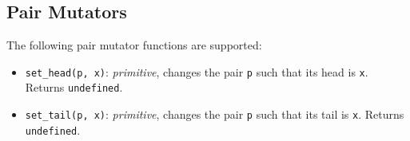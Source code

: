 \subsection*{Pair Mutators}

The following pair mutator functions are supported:

\begin{itemize}
\item \lstinline{set_head(p, x)}: \textit{primitive}, changes the pair \lstinline{p} such that its head is \lstinline{x}.
Returns \lstinline{undefined}.
\item \lstinline{set_tail(p, x)}: \textit{primitive}, changes the pair \lstinline{p} such that its tail is \lstinline{x}.
Returns \lstinline{undefined}.
\end{itemize}

  


